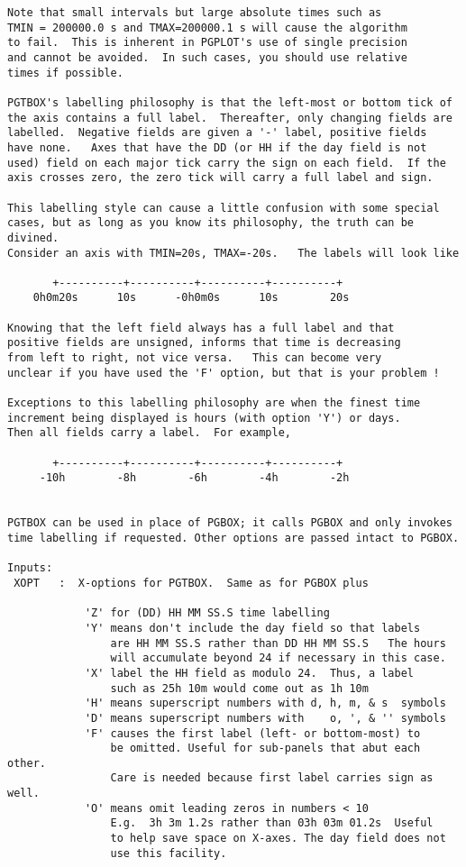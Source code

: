 {\begin{verbatim}
Note that small intervals but large absolute times such as
TMIN = 200000.0 s and TMAX=200000.1 s will cause the algorithm
to fail.  This is inherent in PGPLOT's use of single precision
and cannot be avoided.  In such cases, you should use relative
times if possible.

PGTBOX's labelling philosophy is that the left-most or bottom tick of
the axis contains a full label.  Thereafter, only changing fields are
labelled.  Negative fields are given a '-' label, positive fields
have none.   Axes that have the DD (or HH if the day field is not
used) field on each major tick carry the sign on each field.  If the
axis crosses zero, the zero tick will carry a full label and sign.

This labelling style can cause a little confusion with some special
cases, but as long as you know its philosophy, the truth can be divined.
Consider an axis with TMIN=20s, TMAX=-20s.   The labels will look like

       +----------+----------+----------+----------+
    0h0m20s      10s      -0h0m0s      10s        20s

Knowing that the left field always has a full label and that
positive fields are unsigned, informs that time is decreasing
from left to right, not vice versa.   This can become very 
unclear if you have used the 'F' option, but that is your problem !

Exceptions to this labelling philosophy are when the finest time
increment being displayed is hours (with option 'Y') or days.  
Then all fields carry a label.  For example,

       +----------+----------+----------+----------+
     -10h        -8h        -6h        -4h        -2h


PGTBOX can be used in place of PGBOX; it calls PGBOX and only invokes 
time labelling if requested. Other options are passed intact to PGBOX.

Inputs:
 XOPT   :  X-options for PGTBOX.  Same as for PGBOX plus 

            'Z' for (DD) HH MM SS.S time labelling
            'Y' means don't include the day field so that labels
                are HH MM SS.S rather than DD HH MM SS.S   The hours
                will accumulate beyond 24 if necessary in this case.
            'X' label the HH field as modulo 24.  Thus, a label
                such as 25h 10m would come out as 1h 10m
            'H' means superscript numbers with d, h, m, & s  symbols
            'D' means superscript numbers with    o, ', & '' symbols 
            'F' causes the first label (left- or bottom-most) to
                be omitted. Useful for sub-panels that abut each other.
                Care is needed because first label carries sign as well.
            'O' means omit leading zeros in numbers < 10
                E.g.  3h 3m 1.2s rather than 03h 03m 01.2s  Useful
                to help save space on X-axes. The day field does not 
                use this facility.


\end{verbatim}}
